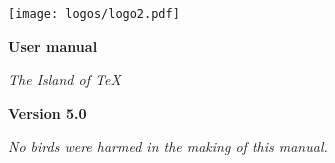 \documentclass[a4paper,oneside,12pt]{memoir}
\newcommand{\araraversion}{5.0}
\begin{document}
\begin{titlingpage}
\vspace*{2em}

\begin{center}
\texttt{[image: logos/logo2.pdf]}

\vspace{4em}

\begin{tcolorbox}[
  boxrule=0pt,
  colback=araracolour,
  top=1em,
  bottom=1em
]
  \color{white}
  \centering
  \Huge
  \sffamily
  \bfseries User manual
\end{tcolorbox}

\vspace{6em}

{\large\em The Island of \TeX\par}

\vspace{3em}

\href{mailto:cereda.paulo@gmail.com}{}%
\quad\href{https://gitlab.com/islandoftex/arara}{}%
\quad\href{http://twitter.com/paulocereda}{}

\vfill

{\color{araracolour}
\LARGE
\sffamily
\bfseries
Version \araraversion}

\end{center}
\end{titlingpage}

\pagestyle{headings}
\frontmatter
\nouppercaseheads

\cleardoublepage

\vspace*{25em}

\begin{flushright}
\em No birds were harmed in the making of this manual.
\end{flushright}

%




\printunsrtglossary

\cleardoublepage

\tableofcontents*

\cleardoublepage

\mainmatter


\end{document}

